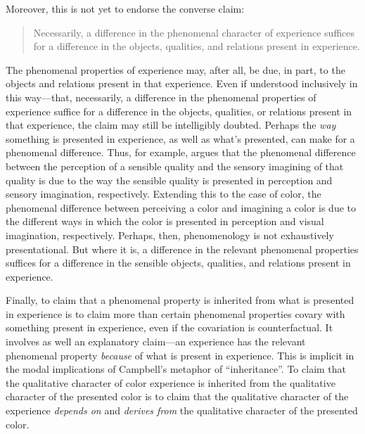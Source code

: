 \documentclass[12pt]{article}
\begin{document}
Moreover, this is not yet to endorse the converse claim:
\begin{quote}
    Necessarily, a difference in the phenomenal character of experience suffices for a difference in the objects, qualities, and relations present in experience. 
\end{quote}
The phenomenal properties of experience may, after all, be due, in part, to the objects and relations present in that experience. Even if understood inclusively in this way---that, necessarily, a difference in the phenomenal properties of experience suffice for a difference in the objects, qualities, or relations present in that experience, the claim may still be intelligibly doubted. Perhaps the \emph{way} something is presented in experience, as well as what's presented, can make for a phenomenal difference. Thus, for example, \citet{Martin:2002cr} argues that the phenomenal difference between the perception of a sensible quality and the sensory imagining of that quality is due to the way the sensible quality is presented in perception and sensory imagination, respectively. Extending this to the case of color, the phenomenal difference between perceiving a color and imagining a color is due to the different ways in which the color is presented in perception and visual imagination, respectively. Perhaps, then, phenomenology is not exhaustively presentational. But where it is, a difference in the relevant phenomenal properties suffices for a difference in the sensible objects, qualities, and relations present in experience.

Finally, to claim that a phenomenal property is inherited from what is presented in experience is to claim more than certain phenomenal properties covary with something present in experience, even if the covariation is counterfactual. It involves as well an explanatory claim---an experience has the relevant phenomenal property \emph{because} of what is present in experience. This is implicit in the modal implications of Campbell's metaphor of ``inheritance''. To claim that the qualitative character of color experience is inherited from the qualitative character of the presented color is to claim that the qualitative character of the experience \emph{depends on} and \emph{derives from} the qualitative character of the presented color. 
\end{document}

